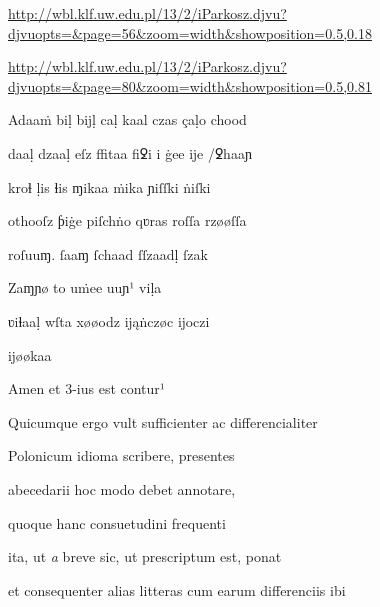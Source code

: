 
\newParkoszpage

{
\url{http://wbl.klf.uw.edu.pl/13/2/iParkosz.djvu?djvuopts=&page=56&zoom=width&showposition=0.5,0.18}

\url{http://wbl.klf.uw.edu.pl/13/2/iParkosz.djvu?djvuopts=&page=80&zoom=width&showposition=0.5,0.81}
}

\bigskip

\obeylines
\mono

\fulllines









\fulllines

Adaaṁ biḷ bĳḷ caḷ kaal czas çaḷo chood 

daaḷ dzaaḷ eſz ﬀitaa fiꝿi i ġee ĳe /ꝿhaaɲ 

kroɬ ḷis ɬis ɱikaa ṁika ɲiſſki ṅiſki 

othooſz ƥiġe piſchṅo qʋras roſſa rzøøſſa 

roſuuɱ. ſaaɱ ſchaad ſſzaadḷ ſzak 

 Zaɱɲø to uṁee uuɲ¹ viḷa 

ʋiɬaaḷ wſta xøøodz ĳąṅczøc ĳoczi

ĳøøkaa

Amen et 3-ius est contur¹

Quicumque ergo vult sufficienter ac differencialiter

Polonicum idioma scribere, presentes 

 abecedarii hoc modo debet annotare, 

 quoque hanc consuetudini frequenti 

 ita, ut \textit{a} breve sic, ut prescriptum est, ponat 

et consequenter alias litteras cum earum differenciis ibi 

